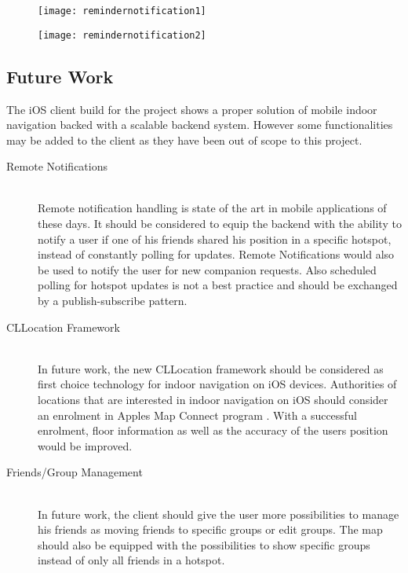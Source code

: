 \begin{figure}
\centering
\begin{minipage}{.5\textwidth}
  \centering
  \texttt{[image: remindernotification1]}
  \label{fig:reminder notification 1}
\end{minipage}%
\begin{minipage}{.5\textwidth}
  \centering
  \texttt{[image: remindernotification2]}
  \label{fig:reminder notification 2}
\end{minipage}
\end{figure}


\subsection{Future Work}
The iOS client build for the project shows a proper solution of mobile indoor navigation backed with a scalable backend system. However some functionalities may be added to the client as they have been out of scope to this project.

\begin{description}
  \item[Remote Notifications] \hfill \\
  Remote notification handling is state of the art in mobile applications of these days. It should be considered to equip the backend with the ability to notify a user if one of his friends shared his position in a specific hotspot, instead of constantly polling for updates. Remote Notifications would also be used to notify the user for new companion requests. Also scheduled polling for hotspot updates is not a best practice and should be exchanged by a publish-subscribe pattern.
  \item[CLLocation Framework] \hfill \\
  In future work, the new CLLocation framework should be considered as first choice technology for indoor navigation on iOS devices. Authorities of locations that are interested in indoor navigation on iOS should consider an enrolment in Apples Map Connect program \cite{MapsConnect}. With a successful enrolment, floor information as well as the accuracy of the users position would be improved.
  \item[Friends/Group Management] \hfill \\
  In future work, the client should give the user more possibilities to manage his friends as moving friends to specific groups or edit groups. The map should also be equipped with the possibilities to show specific groups instead of only all friends in a hotspot.
\end{description}
